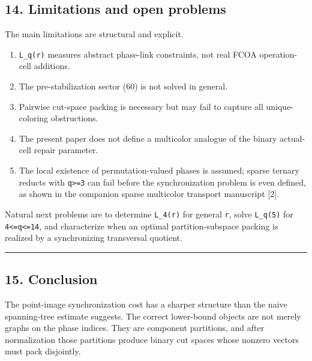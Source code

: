 \hypertarget{limitations-and-open-problems}{%
\subsection{14. Limitations and open
problems}\label{limitations-and-open-problems}}

The main limitations are structural and explicit.

\begin{enumerate}
\def\labelenumi{\arabic{enumi}.}
\tightlist
\item
  \texttt{L\_q(r)} measures abstract phase-link constraints, not real
  FCOA operation-cell additions.
\item
  The pre-stabilization sector (60) is not solved in general.
\item
  Pairwise cut-space packing is necessary but may fail to capture all
  unique-coloring obstructions.
\item
  The present paper does not define a multicolor analogue of the binary
  actual-cell repair parameter.
\item
  The local existence of permutation-valued phases is assumed; sparse
  ternary reducts with \texttt{q\textgreater{}=3} can fail before the
  synchronization problem is even defined, as shown in the companion
  sparse multicolor transport manuscript {[}2{]}.
\end{enumerate}

Natural next problems are to determine \texttt{L\_4(r)} for general
\texttt{r}, solve \texttt{L\_q(5)} for
\texttt{4\textless{}=q\textless{}=14}, and characterize when an optimal
partition-subspace packing is realized by a synchronizing transversal
quotient.

\begin{center}\rule{0.5\linewidth}{0.5pt}\end{center}

\hypertarget{conclusion}{%
\subsection{15. Conclusion}\label{conclusion}}

The point-image synchronization cost has a sharper structure than the
naive spanning-tree estimate suggests. The correct lower-bound objects
are not merely graphs on the phase indices. They are component
partitions, and after normalization those partitions produce binary cut
spaces whose nonzero vectors must pack disjointly.

